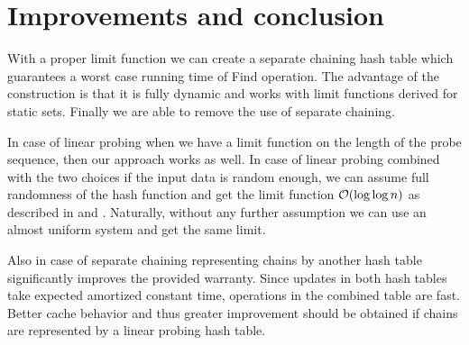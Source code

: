 \section{Improvements and conclusion}
\label{section-conclusion}
With a proper limit function we can create a separate chaining hash table which guarantees a worst case running time of Find operation.
The advantage of the construction is that it is fully dynamic and works with limit functions derived for static sets.
Finally we are able to remove the use of separate chaining.

In case of linear probing when we have a limit function on the length of the probe sequence, then our approach works as well.
In case of linear probing combined with the two choices if the input data is random enough, we can assume full randomness of the hash function and get the limit function $\mathcal{O}(\log \log n)$ as described in \cite{DBLP:conf/soda/MitzenmacherV08} and \cite{Malalla:2004:THS:1124034}. 
Naturally, without any further assumption we can use an almost uniform system and get the same limit.

Also in case of separate chaining representing chains by another hash table significantly improves the provided warranty.
Since updates in both hash tables take expected amortized constant time, operations in the combined table are fast.
Better cache behavior and thus greater improvement should be obtained if chains are represented by a linear probing hash table.

